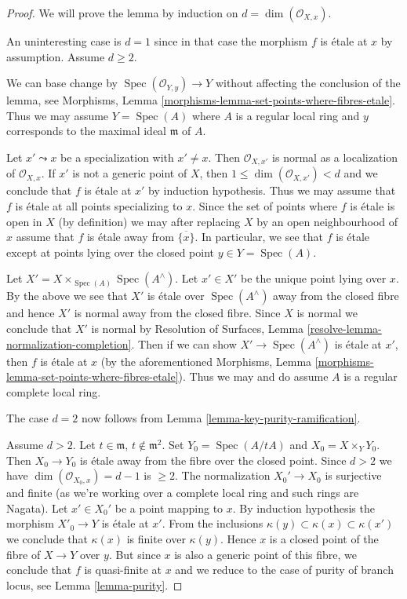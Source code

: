 \documentclass{stacks-project}
\theoremstyle{plain}
\theoremstyle{definition}
\theoremstyle{remark}
\numberwithin{equation}{subsection}
\def\Spec{\mathop{\mathrm{Spec}}}
\begin{document}
\begin{proof}
We will prove the lemma by induction on $d = \dim(\mathcal{O}_{X, x})$.

\medskip\noindent
An uninteresting case is $d = 1$ since in that case the morphism
$f$ is \'etale at $x$ by assumption. Assume $d \geq 2$.

\medskip\noindent
We can base change by $\Spec(\mathcal{O}_{Y, y}) \to Y$
without affecting the conclusion of the lemma, see
Morphisms, Lemma \ref{morphisms-lemma-set-points-where-fibres-etale}.
Thus we may assume $Y = \Spec(A)$ where $A$ is a regular local
ring and $y$ corresponds to the maximal ideal $\mathfrak m$ of $A$.

\medskip\noindent
Let $x' \leadsto x$ be a specialization with $x' \not = x$.
Then $\mathcal{O}_{X, x'}$ is normal as a localization of
$\mathcal{O}_{X, x}$. If $x'$ is not a generic point of $X$,
then $1 \leq \dim(\mathcal{O}_{X, x'}) < d$ and we conclude that
$f$ is \'etale at $x'$ by induction hypothesis.
Thus we may assume that $f$ is \'etale at all points specializing to
$x$. Since the set of points where $f$ is \'etale is open in $X$
(by definition) we may after replacing $X$ by an open neighbourhood of $x$
assume that $f$ is \'etale away from $\overline{\{x\}}$.
In particular, we see that $f$ is \'etale except at points
lying over the closed point $y \in Y = \Spec(A)$.

\medskip\noindent
Let $X' = X \times_{\Spec(A)} \Spec(A^\wedge)$. Let $x' \in X'$
be the unique point lying over $x$. By the above we see that
$X'$ is \'etale over $\Spec(A^\wedge)$ away from the closed fibre and
hence $X'$ is normal away from the closed fibre. Since $X$ is normal
we conclude that $X'$ is normal by
Resolution of Surfaces, Lemma \ref{resolve-lemma-normalization-completion}.
Then if we can show $X' \to \Spec(A^\wedge)$ is \'etale at $x'$,
then $f$ is \'etale at $x$ (by the aforementioned
Morphisms, Lemma \ref{morphisms-lemma-set-points-where-fibres-etale}).
Thus we may and do assume $A$ is a regular complete local ring.

\medskip\noindent
The case $d = 2$ now follows from Lemma \ref{lemma-key-purity-ramification}.

\medskip\noindent
Assume $d > 2$. Let $t \in \mathfrak m$, $t \not \in \mathfrak m^2$.
Set $Y_0 = \Spec(A/tA)$ and $X_0 = X \times_Y Y_0$.
Then $X_0 \to Y_0$ is \'etale away from the fibre over the closed point.
Since $d > 2$ we have $\dim(\mathcal{O}_{X_0, x}) = d - 1$ is $\geq 2$.
The normalization $X_0' \to X_0$ is surjective and finite
(as we're working over a complete local ring and such rings are Nagata).
Let $x' \in X_0'$ be a point mapping to $x$. By induction hypothesis the
morphism $X'_0 \to Y$ is \'etale at $x'$. From the inclusions
$\kappa(y) \subset \kappa(x) \subset \kappa(x')$
we conclude that $\kappa(x)$ is finite over $\kappa(y)$.
Hence $x$ is a closed point of the fibre of $X \to Y$
over $y$. But since $x$ is also a generic point of
this fibre, we conclude that $f$ is quasi-finite at $x$
and we reduce to the case of purity of branch locus, see
Lemma \ref{lemma-purity}.
\end{proof}
\end{document}
